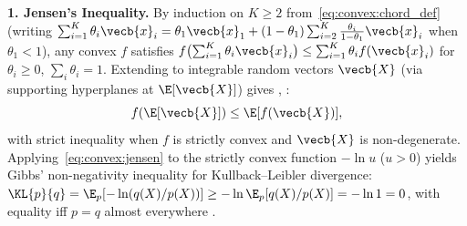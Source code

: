 \documentclass[../../../../master.tex]{subfiles}
\begin{document}
\begin{coremath}
\label{cm:convex:jensen_orders}
\textbf{1. Jensen's Inequality.} By induction on $K \ge 2$ from~\eqref{eq:convex:chord_def} (writing $\sum_{i=1}^K \theta_i \vecb{x}_i = \theta_1 \vecb{x}_1 + (1-\theta_1)\sum_{i=2}^K \frac{\theta_i}{1-\theta_1}\vecb{x}_i$ when $\theta_1 < 1$), any convex $f$ satisfies $f\bigl(\sum_{i=1}^K \theta_i \vecb{x}_i\bigr) \le \sum_{i=1}^K \theta_i f(\vecb{x}_i)$ for $\theta_i \ge 0$, $\sum_i \theta_i = 1$. Extending to integrable random vectors $\vecb{X}$ (via supporting hyperplanes at $\E[\vecb{X}]$) gives , :
\begin{equation}
  f(\E[\vecb{X}]) \le \E[f(\vecb{X})],
  \label{eq:convex:jensen}
\end{equation}
with strict inequality when $f$ is strictly convex and $\vecb{X}$ is non-degenerate. Applying~\eqref{eq:convex:jensen} to the strictly convex function $-\ln u$ ($u > 0$) yields Gibbs' non-negativity inequality for Kullback--Leibler divergence: $\KL{p}{q} = \E_p[-\ln(q(X)/p(X))] \ge -\ln \E_p[q(X)/p(X)] = -\ln 1 = 0$, with equality iff $p = q$ almost everywhere .


\end{coremath}
\end{document}
